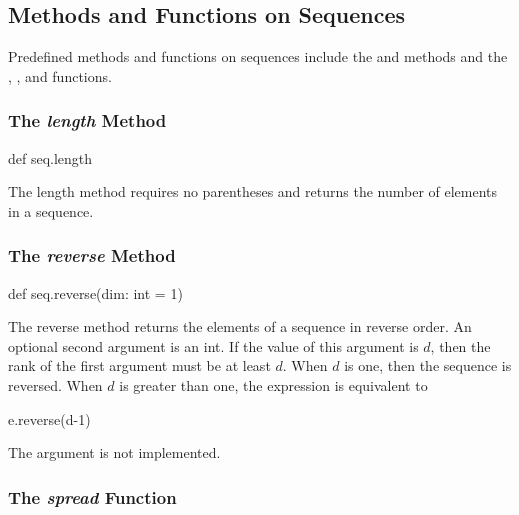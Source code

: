 \subsection{Methods and Functions on Sequences}
\label{Methods_and_Functions_on_Sequences}

Predefined methods and functions on sequences include
the  and  methods and
the , , and  functions.

\subsubsection{The {\em length} Method}
\label{The_em_length_Method}

\begin{chapel}
def seq.length
\end{chapel}

The length method requires no parentheses and returns the number of
elements in a sequence.

\subsubsection{The {\em reverse} Method}
\label{The_em_reverse_Method}

\begin{chapel}
def seq.reverse(dim: int = 1)
\end{chapel}

The reverse method returns the elements of a sequence in reverse
order.  An optional second argument is an int. If the value of this
argument is $d$, then the rank of the first argument must be at least
$d$. When $d$ is one, then the sequence is reversed. When $d$ is
greater than one, the expression  is equivalent to
\begin{chapel}
[e in s] e.reverse(d-1)
\end{chapel}

\begin{implementation}
The  argument is not implemented.
\end{implementation}

\subsubsection{The {\em spread} Function}
\label{The_em_spread_Function}

